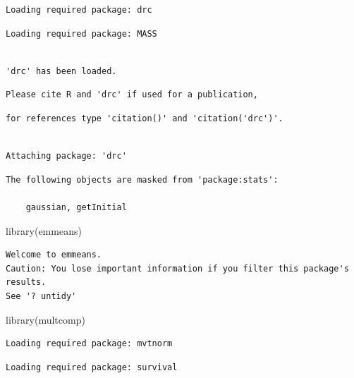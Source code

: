 \documentclass[
  letterpaper,
  DIV=11,
  numbers=noendperiod]{scrreprt}
\newenvironment{Shaded}{\begin{snugshade}}{\end{snugshade}}
\newcommand{\FunctionTok}[1]{\textcolor[rgb]{0.28,0.35,0.67}{#1}}
\newcommand{\NormalTok}[1]{\textcolor[rgb]{0.00,0.23,0.31}{#1}}
\begin{document}
\begin{verbatim}
Loading required package: drc
\end{verbatim}

\begin{verbatim}
Loading required package: MASS
\end{verbatim}

\begin{verbatim}

'drc' has been loaded.
\end{verbatim}

\begin{verbatim}
Please cite R and 'drc' if used for a publication,
\end{verbatim}

\begin{verbatim}
for references type 'citation()' and 'citation('drc')'.
\end{verbatim}

\begin{verbatim}

Attaching package: 'drc'
\end{verbatim}

\begin{verbatim}
The following objects are masked from 'package:stats':

    gaussian, getInitial
\end{verbatim}

\begin{Shaded}
\begin{Highlighting}[]
\FunctionTok{library}\NormalTok{(emmeans)}
\end{Highlighting}
\end{Shaded}

\begin{verbatim}
Welcome to emmeans.
Caution: You lose important information if you filter this package's results.
See '? untidy'
\end{verbatim}

\begin{Shaded}
\begin{Highlighting}[]
\FunctionTok{library}\NormalTok{(multcomp)}
\end{Highlighting}
\end{Shaded}

\begin{verbatim}
Loading required package: mvtnorm
\end{verbatim}

\begin{verbatim}
Loading required package: survival
\end{verbatim}
\end{document}
